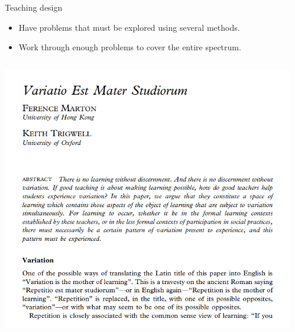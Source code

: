 \begin{frame}[fragile]
  \begin{block}{Teaching design}
    \begin{itemize}
      \item Have problems that must be explored using several 
        methods.
      \item Work through enough problems to cover the entire spectrum.
    \end{itemize}
  \end{block}

  \begin{remark}
    \begin{columns}[T]
      \begin{column}{0.6\columnwidth}
          \centering
          \includegraphics[width=0.8\columnwidth]{figs/variatio-mater-studiorum.png}
        \end{column}
        \begin{column}{0.4\columnwidth}

\end{column}
\end{columns}
\end{remark}
\end{frame}
